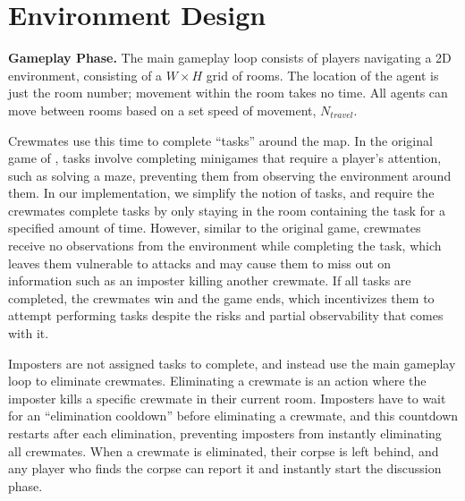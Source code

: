 
\newpage
\clearpage
\appendix

\onecolumn



\section{Environment Design}
\label{app:env}


\smallskip

\noindent \textbf{Gameplay Phase.} The main gameplay loop consists of players navigating a 2D environment, consisting of a $W \times H$ grid of rooms. The location of the agent is just the room number; movement within the room takes no time. All agents can move between rooms based on a set speed of movement, $N_{travel}$. 

Crewmates use this time to complete ``tasks'' around the map. In the original game of \acro, tasks involve completing minigames that require a player's attention, such as solving a maze, preventing them from observing the environment around them. In our implementation, we simplify the notion of tasks, and require the crewmates complete tasks by only staying in the room containing the task for a specified amount of time. However, similar to the original game, crewmates receive no observations from the environment while completing the task, which leaves them vulnerable to attacks and may cause them to miss out on information such as an imposter killing another crewmate. If all tasks are completed, the crewmates win and the game ends, which incentivizes them to attempt performing tasks despite the risks and partial observability that comes with it.

Imposters are not assigned tasks to complete, and instead use the main gameplay loop to eliminate crewmates. Eliminating a crewmate is an action where the imposter kills a specific crewmate in their current room. Imposters have to wait for an ``elimination cooldown'' before eliminating a crewmate, and this countdown restarts after each elimination, preventing imposters from instantly eliminating all crewmates. When a crewmate is eliminated, their corpse is left behind, and any player who finds the corpse can report it and instantly start the discussion phase.

